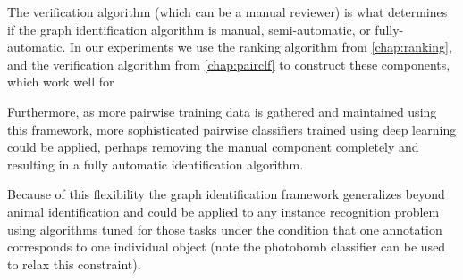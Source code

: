 The verification algorithm (which can be a manual reviewer) is what determines
  if the graph identification algorithm is manual, semi-automatic, or
  fully-automatic.
In our experiments we use the ranking algorithm from \cref{chap:ranking}, and
  the verification algorithm from \cref{chap:pairclf} to construct these
  components, which work well for
  
Furthermore, as more pairwise training data is gathered and maintained using
  this framework, more sophisticated pairwise classifiers trained using deep
  learning could be applied, perhaps removing the manual component completely
  and resulting in a fully automatic identification algorithm.

Because of this flexibility the graph identification framework generalizes
  beyond animal identification and could be applied to any instance recognition
  problem using algorithms tuned for those tasks under the condition that one
  annotation corresponds to one individual object (note the photobomb classifier
  can be used to relax this constraint).


